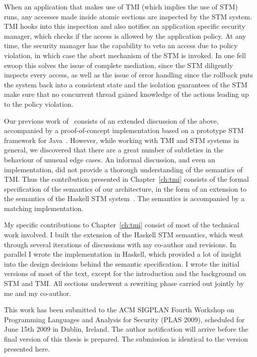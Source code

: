 When an application that makes use of TMI (which implies the use of STM) runs,
any accesses made inside atomic sections are inspected by the STM system. TMI
hooks into this inspection and also notifies an application specific security
manager, which checks if the access is allowed by the application policy. At any
time, the security manager has the capability to veto an access due to policy
violation, in which case the abort mechanism of the STM is invoked. In one fell
swoop this solves the issue of complete mediation, since the STM diligently
inspects every access, as well as the issue of error handling since the rollback
puts the system back into a consistent state and the isolation guarantees of the
STM make sure that no concurrent thread gained knowledge of the actions leading
up to the policy violation.

Our previous work of~\cite{tmi} consists of an extended discussion of the above,
accompanied by a proof-of-concept implementation based on a prototype STM framework
for Java~\cite{hlm06}. However, while working with TMI and STM systems in general,
we discovered that there are a great number of subtleties in the behaviour of
unusual edge cases. An informal discussion, and even an implementation, did not
provide a thorough understanding of the semantics of TMI. Thus the contribution
presented in Chapter~\ref{ch:tmi} consists of the formal specification of the semantics
of our architecture, in the form of an extension to the semantics of the Haskell
STM system~\cite{haskellstm}. The semantics is accompanied by a matching implementation.

My specific contributions to Chapter~\ref{ch:tmi} consist of most of the technical
work involved. I built the extension of the Haskell STM semantics, which went
through several iterations of discussions with my co-author and revisions. In
parallel I wrote the implementation in Haskell, which provided a lot of insight
into the design decisions behind the semantic specification. I wrote the initial
versions of most of the text, except for the introduction and the background on
STM and TMI. All sections underwent a rewriting phase carried out jointly by
me and my co-author.

This work has been submitted to the ACM SIGPLAN Fourth Workshop on Programming
Languages and Analysis for Security (PLAS 2009), scheduled for June 15th 2009
in Dublin, Ireland. The author notification will arrive before the final version
of this thesis is prepared. The submission is identical to the version presented
here.